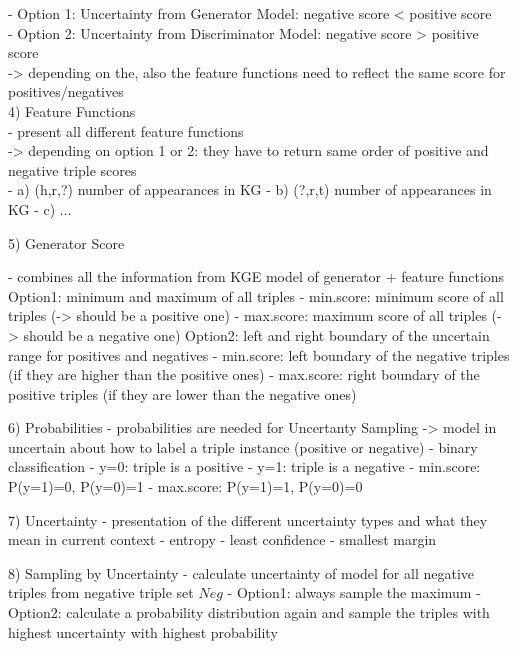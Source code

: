 - Option 1: Uncertainty from Generator Model: negative score < positive score\\
- Option 2: Uncertainty from Discriminator Model: negative score > positive score\\
-> depending on the, also the feature functions need to reflect the same score for positives/negatives\\

4) Feature Functions\\

- present all different feature functions\\
-> depending on option 1 or 2: they have to return same order of positive and negative triple scores\\
- a) (h,r,?) number of appearances in KG
- b) (?,r,t) number of appearances in KG
- c) ...

5) Generator Score

- combines all the information from KGE model of generator + feature functions
Option1: minimum and maximum of all triples
- min.score: minimum score of all triples (-> should be a positive one)
- max.score: maximum score of all triples (-> should be a negative one)
Option2: left and right boundary of the uncertain range for positives and negatives
- min.score: left boundary of the negative triples (if they are higher than the positive ones)
- max.score: right boundary of the positive triples (if they are lower than the negative ones)

6) Probabilities 
- probabilities are needed for Uncertanty Sampling 
-> model in uncertain about how to label a triple instance (positive or negative)
- binary classification
- y=0: triple is a positive
- y=1: triple is a negative
- min.score: P(y=1)=0, P(y=0)=1 
- max.score: P(y=1)=1, P(y=0)=0


7) Uncertainty
- presentation of the different uncertainty types and what they mean in current context
- entropy
- least confidence
- smallest margin

8) Sampling by Uncertainty
- calculate uncertainty of model for all negative triples from negative triple set $Neg$
- Option1: always sample the maximum
- Option2: calculate a probability distribution again and sample the triples with highest uncertainty with highest probability




















